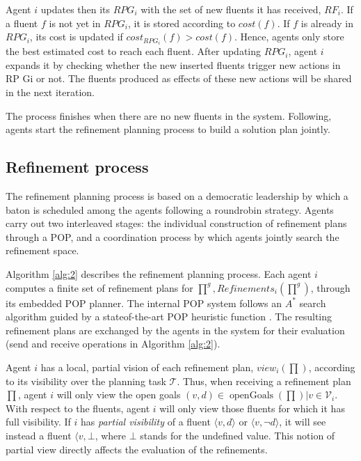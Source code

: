 \documentclass[12pt]{article}
\DeclareMathOperator{\openGoals}{openGoals}
\begin{document}
Agent $i$ updates then its $RPG_i$ with the set of new fluents it has received, $RF_i$.
If a fluent $f$ is not yet in $RPG_i$, it is stored according to $cost(f)$.
If $f$ is already in $RPG_i$, its cost is updated if $cost_{RPG_i}(f) > cost(f)$.
Hence, agents only store the best estimated cost to reach each fluent.
After updating $RPG_i$, agent $i$ expands it by checking whether the new inserted fluents trigger new actions in RP Gi or not.
The fluents produced as effects of these new actions will be shared in the next iteration.

The process finishes when there are no new fluents in the system.
Following, agents start the refinement planning process to build a solution plan jointly.

\subsection{Refinement process}

The refinement planning process is based on a democratic leadership by which a baton is scheduled among the agents following a roundrobin strategy.
Agents carry out two interleaved stages: the individual construction of refinement plans through a POP, and a coordination process by which agents jointly search the refinement space.

Algorithm \ref{alg:2} describes the refinement planning process.
Each agent $i$ computes a finite set of refinement plans for $\prod^g, Refinements_i(\prod^g)$, through its embedded POP planner.
The internal POP system follows an $A^\ast$ search algorithm guided by a stateof-the-art POP heuristic function \cite{Younes2003VHPOPVH}.
The resulting refinement plans are exchanged by the agents in the system for their evaluation (send and receive operations in Algorithm \ref{alg:2}).

Agent $i$ has a local, partial vision of each refinement plan, $view_i(\prod)$, according to its visibility over the planning task $\mathcal{T}$.
Thus, when receiving a refinement plan $\prod$, agent $i$ will only view the open goals $(v, d) \in \openGoals(\prod) | v \in \mathcal{V}_i$.
With respect to the fluents, agent $i$ will only view those fluents for which it has full visibility.
If $i$ has \textit{partial visibility} of a fluent $\langle v,d\rangle$ or $\langle v,\neg d\rangle$, it will see instead a fluent $\langle v,\bot$, where $\bot$ stands for the undefined value.
This notion of partial view directly affects the evaluation of the refinements.
\end{document}
